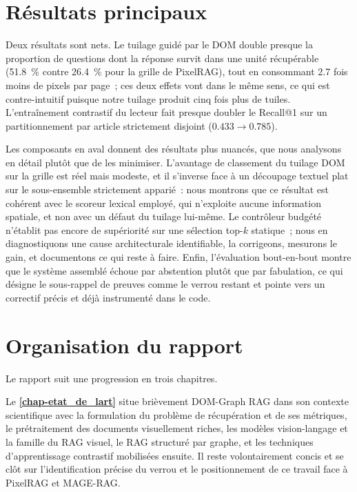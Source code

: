 \section*{Résultats principaux}

Deux résultats sont nets. Le tuilage guidé par le DOM double presque la
proportion de questions dont la réponse survit dans une unité récupérable
(\SI{51.8}{\percent} contre \SI{26.4}{\percent} pour la grille de PixelRAG),
tout en consommant \num{2.7} fois moins de pixels par page~; ces deux effets
vont dans le même sens, ce qui est contre-intuitif puisque notre tuilage
produit cinq fois plus de tuiles. L'entraînement contrastif du lecteur fait
presque doubler le Recall@1 sur un partitionnement par article strictement
disjoint ($\num{0.433} \rightarrow \num{0.785}$).

Les composants en aval donnent des résultats plus nuancés, que nous analysons
en détail plutôt que de les minimiser. L'avantage de classement du tuilage DOM
sur la grille est réel mais modeste, et il s'inverse face à un découpage
textuel plat sur le sous-ensemble strictement apparié~: nous montrons que ce
résultat est cohérent avec le scoreur lexical employé, qui n'exploite aucune
information spatiale, et non avec un défaut du tuilage lui-même. Le contrôleur
budgété n'établit pas encore de supériorité sur une sélection top-$k$
statique~; nous en diagnostiquons une cause architecturale identifiable, la
corrigeons, mesurons le gain, et documentons ce qui reste à faire. Enfin,
l'évaluation bout-en-bout montre que le système assemblé échoue par
abstention plutôt que par fabulation, ce qui désigne le sous-rappel de
preuves comme le verrou restant et pointe vers un correctif précis et
déjà instrumenté dans le code.

\section*{Organisation du rapport}

Le rapport suit une progression en trois chapitres.

Le \textbf{\cref{chap-etat_de_lart}} situe brièvement DOM-Graph RAG dans son
contexte scientifique avec la formulation du problème de récupération et de ses
métriques, le prétraitement des documents visuellement riches, les modèles
vision-langage et la famille du RAG visuel, le RAG structuré par graphe, et
les techniques d'apprentissage contrastif mobilisées ensuite. Il reste volontairement
concis et se clôt sur l'identification précise du
verrou et le positionnement de ce travail face à PixelRAG et MAGE-RAG.


